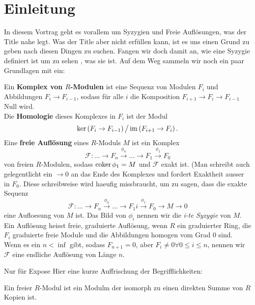 \documentclass{article}
\begin{document}
\section{Einleitung}
	In diesem Vortrag geht es vorallem um Syzygien und Freie Aufl\"osungen, 
	was der Title nahe legt.
	Was der Title aber nicht erf\"ullen kann, 
	ist es uns einen Grund zu geben nach diesen Dingen zu suchen.
	Fangen wir doch damit an, 
	wie eine Syzygie definiert ist um zu sehen
	, was sie ist.
	Auf dem Weg sammeln wir noch ein paar Grundlagen mit ein:
	\begin{defn}[\nocite{Eis1} ]
		Ein \textbf{Komplex von \( R \)-Modulen} 
		ist eine Sequenz von Modulen 
		\( F_{i} \)
		und Abbildungen
		\( F_{i} \to F_{i-1} \),
		sodass f\"ur alle 
		\( i \) 
		die Komposition
		\( F_{i+1} \to F_{i} \to F_{i-1} \)
		Null wird. \\
		Die \textbf{Homologie} dieses Komplexes in 
		\( F_{i} \)
		ist der  Modul
		\[
			\ker\left( F_{i} \to F_{i-1 } \right) \big/ 
			\operatorname{im} \left( F_{i+1} \to F_{i} \right).
		\]		
		Eine \textbf{freie Aufl\"osung} eines 
		\(R\)-Moduls 
		\(M\)
		ist ein Komplex
		\[
			\mathcal{F}: \dots \to F_{n} 
			\overset{\phi_{n}}{\to} 
			\dots \to F_{1}
			\overset{\phi_{1}}{\to} F_{0}
		\]
		von freien
		\(R\)-Modulen, sodass 
		\( \operatorname{coker} \phi_{1} = M \)
		und
		\( \mathcal{F} \)
		exakt ist.
		(Man schreibt auch gelegentlicht ein 
		\( \to 0 \) 
		an das Ende des Komplexes
		und fordert Exaktheit ausser in 
		\( F_{0} \).
		Diese schreibweise wird haeufig missbraucht,
		um zu sagen, 
		dass die exakte Sequenz
		\[
			\mathcal{F}: \dots \to F_{n} 
			\overset{\phi_{n}}{\to} 
			\dots \to F_{1}i
			\overset{\phi_{1}}{\to} F_{0}
			\to M 
			\to 0
		\]
		eine Aufloesung von 
		\(M \)
		ist.
		Das Bild von
		\( \phi_{i} \)
		nennen wir die
		\emph{i-te Syzygie} 
		von 
		\( M \).\\
		Ein Aufl\"osung heisst freie, graduierte Aufl\"osung,
		wenn 
		\( R \) ein graduierter Ring,
		die 
		\( F_{i} \)
		graduierte freie Module
		und die Abbildungen homogen vom Grad 0 sind.
		Wenn es ein
		\( n < \inf \) 
		gibt, sodass 
		\(F_{n+1}=0 \),
		aber 
		\( F_{i} \neq 0 \forall 0 \le i \le n \),
		nennen wir 
		\( \mathcal{F} \) 
		eine endliche Aufl\"osung von L\"ange 
		\( n \).
	\end{defn}
	{\color{red}Nur f\"ur Expose}
	Hier eine kurze Auffrischung der Begrifflichkeiten:
	\begin{defn}
		Ein freier 
		\(R\)-Modul
		ist ein Modulm der isomorph zu einen direkten Summe von 
		\( R \)
		Kopien ist.
	\end{defn}
\end{document}
